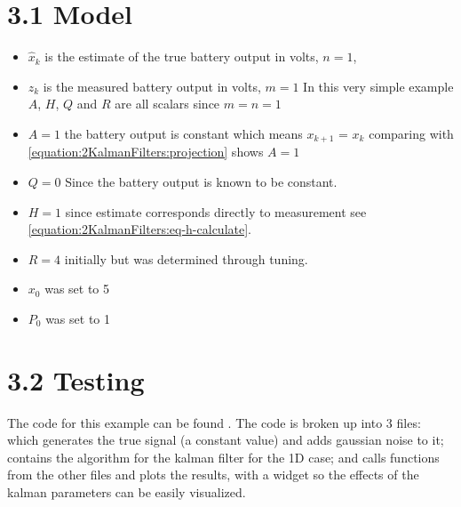 \documentclass[letterpaper,10pt,english]{jupyterBook}
\begin{document}
\section{3.1 Model}
\label{\detokenize{3ExampleBatteryOutput:model}}\begin{itemize}
\item {} 
\sphinxAtStartPar
\(\hat{x}_k\) is the estimate of the true battery output in volts, \(n = 1\),

\item {} 
\sphinxAtStartPar
\(z_k\) is the measured battery output in volts, \(m=1\)
In this very simple example \(A\), \(H\), \(Q\) and \(R\) are all scalars since \(m=n=1\)

\item {} 
\sphinxAtStartPar
\(A=1\) the battery output is constant which means \(x_{k+1}\) = \(x_k\) comparing with \eqref{equation:2KalmanFilters:projection} shows \(A = 1\)

\item {} 
\sphinxAtStartPar
\(Q = 0\) Since the battery output is known to be constant.

\item {} 
\sphinxAtStartPar
\(H = 1\) since estimate corresponds directly to measurement see \eqref{equation:2KalmanFilters:eq-h-calculate}.

\item {} 
\sphinxAtStartPar
\(R = 4\) initially but was determined through tuning.

\item {} 
\sphinxAtStartPar
\(x_0\) was set to 5

\item {} 
\sphinxAtStartPar
\(P_0\) was set to 1

\end{itemize}


\section{3.2 Testing}
\label{\detokenize{3ExampleBatteryOutput:testing}}
\sphinxAtStartPar
The code for this example can be found . The code is broken up into 3 files:  which generates the true signal (a constant value) and adds gaussian noise to it;  contains the algorithm for the kalman filter for the 1D case; and  calls functions from the other files and plots the results, with a widget so the effects of the kalman parameters can be easily visualized.
\end{document}
